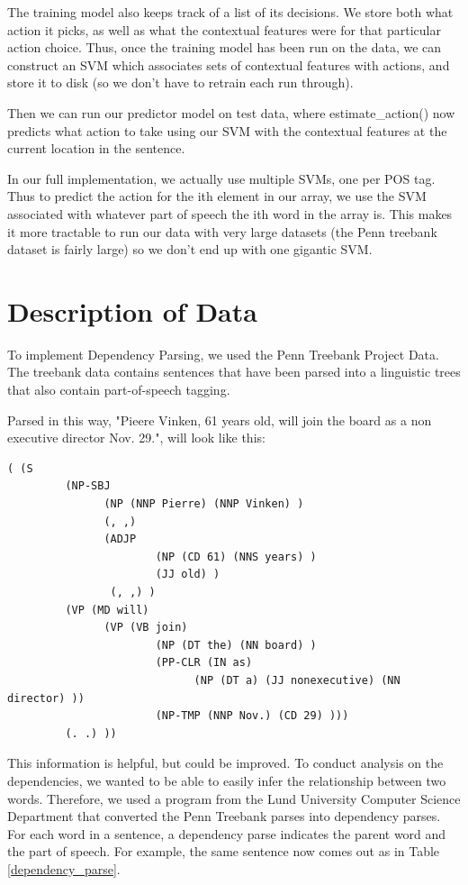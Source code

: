 \documentclass[12pt]{amsart}
\begin{document}
The training model also keeps track of a list of its decisions. We store both
what action it picks, as well as what the contextual features were for that
particular action choice. Thus, once the training model has been run on the
data, we can construct an SVM which associates sets of contextual features 
with actions, and store it to disk (so we don't have to retrain each run
through).

Then we can run our predictor model on test data, where estimate\_action()
now predicts what action to take using our SVM with the contextual
features at the current location in the sentence.

In our full implementation, we actually use multiple SVMs, one per POS tag.
Thus to predict the action for the ith element in our array, we use the SVM
associated with whatever part of speech the ith word in the array is. This
makes it more tractable to run our data with very large datasets (the Penn
treebank dataset is fairly large) so we don't end up with one gigantic SVM.

\section{Description of Data}
To implement Dependency Parsing, we used the Penn Treebank Project Data. The treebank data contains sentences that have been parsed into a linguistic trees that also contain part-of-speech tagging.

Parsed in this way, "Pieere Vinken, 61 years old, will join the board as a non executive director Nov. 29.", will look like this: 
\begin{verbatim}
( (S
         (NP-SBJ 
               (NP (NNP Pierre) (NNP Vinken) )
               (, ,) 
               (ADJP
                       (NP (CD 61) (NNS years) )
                       (JJ old) )
                (, ,) )
         (VP (MD will) 
               (VP (VB join) 
                       (NP (DT the) (NN board) )
                       (PP-CLR (IN as) 
                             (NP (DT a) (JJ nonexecutive) (NN director) ))
                       (NP-TMP (NNP Nov.) (CD 29) )))
         (. .) ))\end{verbatim}

This information is helpful, but could be improved. To conduct analysis on the dependencies, we wanted to be able to easily infer the relationship between two words. Therefore, we used a program from the Lund University Computer Science Department that converted the Penn Treebank parses into dependency parses. For each word in a sentence, a dependency parse indicates the parent word and the part of speech. For example, the same sentence now comes out as in Table \ref{dependency_parse}.
\end{document}
